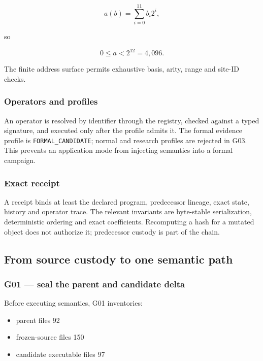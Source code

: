 \[
a(b)=\sum_{i=0}^{11}b_i2^i,
\]

so

\[
0\le a<2^{12}=4{,}096.
\]

The finite address surface permits exhaustive basis, arity, range and
site-ID checks.

\subsubsection{Operators and profiles}\label{viii-ch02-operators-and-profiles}

An operator is resolved by identifier through the registry, checked
against a typed signature, and executed only after the profile admits
it. The formal evidence profile is \texttt{FORMAL\_CANDIDATE}; normal
and research profiles are rejected in G03. This prevents an application
mode from injecting semantics into a formal campaign.

\subsubsection{Exact receipt}\label{viii-ch02-exact-receipt}

A receipt binds at least the declared program, predecessor lineage,
exact state, history and operator trace. The relevant invariants are
byte-stable serialization, deterministic ordering and exact
coefficients. Recomputing a hash for a mutated object does not authorize
it; predecessor custody is part of the chain.

\subsection{From source custody to one semantic
path}\label{viii-ch02-from-source-custody-to-one-semantic-path}

\subsubsection{G01 --- seal the parent and candidate
delta}\label{viii-ch02-g01-seal-the-parent-and-candidate-delta}

Before executing semantics, G01 inventories:

\begin{itemize}
\tightlist
\item
  parent files 92
\item
  frozen-source files 150
\item
  candidate executable files 97
\end{itemize}


